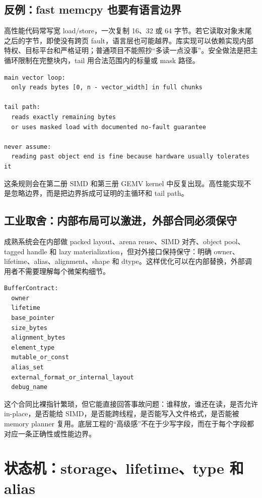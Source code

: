 \subsection{反例：fast memcpy 也要有语言边界}

高性能代码常写宽 load/store，一次复制 16、32 或 64 字节。若它读取对象末尾之后的字节，即使没有跨页 fault，语言层也可能越界。库实现可以依赖实现内部特权、目标平台和严格证明；普通项目不能照抄“多读一点没事”。安全做法是把主循环限制在完整块内，tail 用合法范围内的标量或 mask 路径。

\begin{lstlisting}[numbers=none,caption={宽复制的边界账本}]
main vector loop:
  only reads bytes [0, n - vector_width] in full chunks

tail path:
  reads exactly remaining bytes
  or uses masked load with documented no-fault guarantee

never assume:
  reading past object end is fine because hardware usually tolerates it
\end{lstlisting}

这条规则会在第二册 SIMD 和第三册 GEMV kernel 中反复出现。高性能实现不是忽略边界，而是把边界拆成可证明的主循环和 tail path。

\subsection{工业取舍：内部布局可以激进，外部合同必须保守}

成熟系统会在内部做 packed layout、arena reuse、SIMD 对齐、object pool、tagged handle 和 lazy materialization，但对外接口保持保守：明确 owner、lifetime、alias、alignment、shape 和 dtype。这样优化可以在内部替换，外部调用者不需要理解每个微架构细节。

\begin{lstlisting}[numbers=none,caption={内存对象的工程描述字段}]
BufferContract:
  owner
  lifetime
  base_pointer
  size_bytes
  alignment_bytes
  element_type
  mutable_or_const
  alias_set
  external_format_or_internal_layout
  debug_name
\end{lstlisting}

这个合同比裸指针繁琐，但它能直接回答事故问题：谁释放，谁还在读，是否允许 in-place，是否能给 SIMD，是否能跨线程，是否能写入文件格式，是否能被 memory planner 复用。底层工程的“高级感”不在于少写字段，而在于每个字段都对应一条正确性或性能边界。

\section{状态机：storage、lifetime、type 和 alias}

